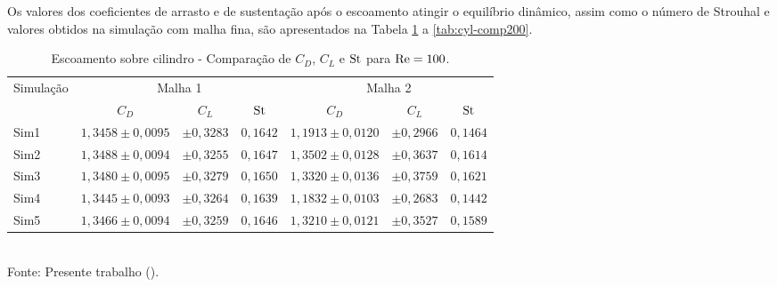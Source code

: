 Os valores dos coeficientes de arrasto e de sustentação após o escoamento atingir o equilíbrio dinâmico, assim como o número de Strouhal e valores obtidos na simulação com malha fina, são apresentados na Tabela \ref{tab:cyl-comp100} a \ref{tab:cyl-comp200}.

\begin{table}[h!]
    \centering
    \caption{Escoamento sobre cilindro - Comparação de $C_D$, $C_L$ e $\mathrm{St}$ para $\mathrm{Re}=100$.}
    \begin{tabular}{lcccccc}
        \hline
        \multirow{2}{*}{Simulação} & \multicolumn{3}{c}{Malha 1} & \multicolumn{3}{c}{Malha 2}                                                         \\\cline{2-7}
                                   & $C_D$                       & $C_L$                       & $\mathrm{St}$   & $C_D$             & $C_L$       & $\mathrm{St}$   \\\hline
        Sim1                       & $1,3458\pm0,0095$           & $\pm0,3283$                 & $0,1642$ & $1,1913\pm0,0120$ & $\pm0,2966$ & $0,1464$ \\
        Sim2                       & $1,3488\pm0,0094$           & $\pm0,3255$                 & $0,1647$ & $1,3502\pm0,0128$ & $\pm0,3637$ & $0,1614$ \\
        Sim3                       & $1,3480\pm0,0095$           & $\pm0,3279$                 & $0,1650$ & $1,3320\pm0,0136$ & $\pm0,3759$ & $0,1621$ \\
        Sim4                       & $1,3445\pm0,0093$           & $\pm0,3264$                 & $0,1639$ & $1,1832\pm0,0103$ & $\pm0,2683$ & $0,1442$ \\
        Sim5                       & $1,3466\pm0,0094$           & $\pm0,3259$                 & $0,1646$ & $1,3210\pm0,0121$ & $\pm0,3527$ & $0,1589$ \\\hline
    \end{tabular}
    \\Fonte: Presente trabalho (\the\year).
    \label{tab:cyl-comp100}
\end{table}

